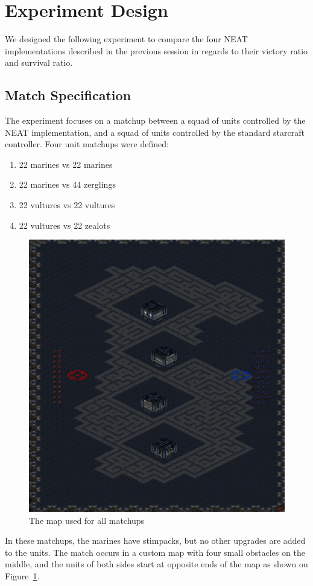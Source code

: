 \section{Experiment Design}

We designed the following experiment to compare the four NEAT
implementations described in the previous session in regards to their
victory ratio and survival ratio.

\subsection{Match Specification}

The experiment focuses on a matchup between a squad of units
controlled by the NEAT implementation, and a squad of units controlled
by the standard starcraft controller. Four unit matchups were defined:
\begin{enumerate}
    \item 22 marines vs 22 marines
    \item 22 marines vs 44 zerglings
    \item 22 vultures vs 22 vultures
    \item 22 vultures vs 22 zealots
\end{enumerate}

\begin{figure}
    \includegraphics[width=.5\textwidth]{figures/scenario_map_overview}
    \caption{The map used for all matchups}\label{fig:map_overview}
\end{figure}

In these matchups, the marines have stimpacks, but no other upgrades
are added to the units. The match occurs in a custom map with four small obstacles
on the middle, and the units of both sides start at
opposite ends of the map as shown on Figure~\ref{fig:map_overview}.

